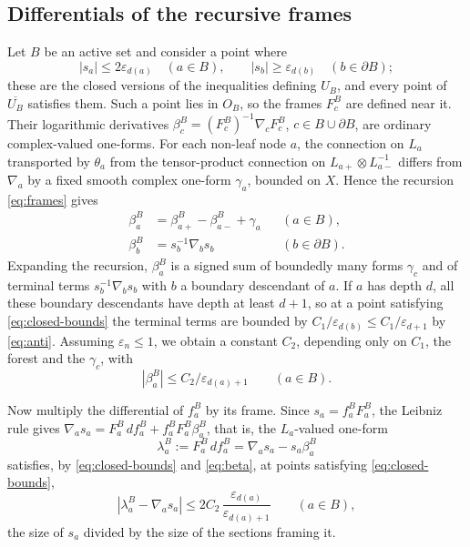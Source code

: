\documentclass[12pt]{article}
\theoremstyle{remark}
\newcommand{\eps}{\varepsilon}
\begin{document}
\subsection*{Differentials of the recursive frames}
Let $B$ be an active set and consider a point where
\begin{equation}\label{eq:closed-bounds}
 |s_a|\le2\eps_{d(a)}\quad(a\in B),\qquad
 |s_b|\ge\eps_{d(b)}\quad(b\in\partial B);
\end{equation}
these are the closed versions of the inequalities defining $U_B$, and
every point of $\overline{U_B}$ satisfies them. Such a point lies in
$O_B$, so the frames $F^B_c$ are defined near it. Their logarithmic
derivatives $\beta^B_c=(F^B_c)^{-1}\nabla_cF^B_c$, $c\in B\cup\partial B$,
are ordinary complex-valued one-forms. For each non-leaf node $a$, the
connection on $L_a$ transported by $\theta_a$ from the tensor-product
connection on $L_{a+}\otimes L_{a-}^{-1}$ differs from $\nabla_a$ by a
fixed smooth complex one-form $\gamma_a$, bounded on $X$. Hence the
recursion \eqref{eq:frames} gives
\begin{align*}
 \beta^B_a&=\beta^B_{a+}-\beta^B_{a-}+\gamma_a &&(a\in B),\\
 \beta^B_b&=s_b^{-1}\nabla_bs_b &&(b\in\partial B).
\end{align*}
Expanding the recursion, $\beta^B_a$ is a signed sum of boundedly many
forms $\gamma_c$ and of terminal terms $s_b^{-1}\nabla_bs_b$ with $b$ a
boundary descendant of $a$. If $a$ has depth $d$, all these boundary
descendants have depth at least $d+1$, so at a point satisfying
\eqref{eq:closed-bounds} the terminal terms are bounded by
$C_1/\eps_{d(b)}\le C_1/\eps_{d+1}$ by \eqref{eq:anti}. Assuming
$\eps_n\le1$, we obtain a constant $C_2$, depending only on $C_1$, the
forest and the $\gamma_c$, with
\begin{equation}\label{eq:beta}
 |\beta^B_a|\le C_2/\eps_{d(a)+1}\qquad(a\in B).
\end{equation}

Now multiply the differential of $f^B_a$ by its frame. Since
$s_a=f^B_aF^B_a$, the Leibniz rule gives
$\nabla_as_a=F^B_a\,df^B_a+f^B_aF^B_a\beta^B_a$, that is, the
$L_a$-valued one-form
\begin{equation}\label{eq:lambda}
 \lambda^B_a:=F^B_a\,df^B_a=\nabla_as_a-s_a\beta^B_a
\end{equation}
satisfies, by \eqref{eq:closed-bounds} and \eqref{eq:beta}, at points
satisfying \eqref{eq:closed-bounds},
\begin{equation}\label{eq:lambda-error}
 |\lambda^B_a-\nabla_as_a|\le2C_2\,\frac{\eps_{d(a)}}{\eps_{d(a)+1}}
 \qquad(a\in B),
\end{equation}
the size of $s_a$ divided by the size of the sections framing it.
\end{document}
